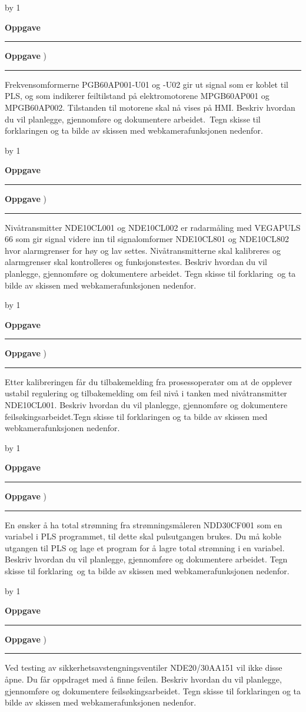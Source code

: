 \documentclass[12pt,a4paper]{article}
\def\oppgave{
            \advance\questnum by 1
	    \ifthenelse{\questnum>0\AND \questnum<9}
	    {
                \vskip 1cm
		\textbf{Oppgave}\hskip 5pt\the\questnum \hfill \hfill
		\vskip 3pt
		\hrule
	\vskip 0.5cm}
	{
                \vskip 1cm
		\textbf{Oppgave}\hskip 5pt \the\questnum \hfill \hfill)
		\vskip 3pt \hrule \vskip 0.5cm }

		}
\begin{document}
\oppgave
Frekvensomformerne PGB60AP001-U01 og -U02 gir ut signal som er koblet til PLS, og som indikerer feiltilstand på elektromotorene MPGB60AP001 og MPGB60AP002. Tilstanden til motorene skal nå vises på HMI.
\vskip 0.25cm
Beskriv hvordan du vil planlegge, gjennomføre og dokumentere arbeidet. Tegn skisse til forklaringen og ta bilde av skissen med webkamerafunksjonen nedenfor.
\oppgave
Nivåtransmitter NDE10CL001 og NDE10CL002 er radarmåling med VEGAPULS 66 som gir signal videre inn til signalomformer NDE10CL801 og NDE10CL802 hvor alarmgrenser for høy og lav settes. Nivåtransmitterne skal kalibreres og alarmgrenser skal kontrolleres og funksjonstestes.
\vskip 0.25cm
Beskriv hvordan du vil planlegge, gjennomføre og dokumentere arbeidet. Tegn skisse til forklaring og ta bilde av skissen med webkamerafunksjonen nedenfor.
\oppgave
Etter kalibreringen får du tilbakemelding fra prosessoperatør om at de opplever ustabil regulering og tilbakemelding om feil nivå i tanken med nivåtransmitter NDE10CL001.
\vskip 0.25cm
Beskriv hvordan du vil planlegge, gjennomføre og dokumentere feilsøkingsarbeidet.Tegn skisse til forklaringen og ta bilde av skissen med webkamerafunksjonen nedenfor.
\oppgave
En ønsker å ha total strømning fra strømningsmåleren NDD30CF001 som en variabel i PLS programmet, til dette skal pulsutgangen brukes. Du må koble utgangen til PLS og lage et program for å lagre total strømning i en variabel.
\vskip 0.25cm
Beskriv hvordan du vil planlegge, gjennomføre og dokumentere arbeidet. Tegn skisse til forklaring og ta bilde av skissen med webkamerafunksjonen nedenfor.
\oppgave
Ved testing av sikkerhetsavstengningsventiler NDE20/30AA151 vil ikke disse åpne. Du får oppdraget med å finne feilen.
\vskip 0.25cm
Beskriv hvordan du vil planlegge, gjennomføre og dokumentere feilsøkingsarbeidet. Tegn skisse til forklaringen og ta bilde av skissen med webkamerafunksjonen nedenfor.
\vskip 0.25cm


\newpage
\end{document}
